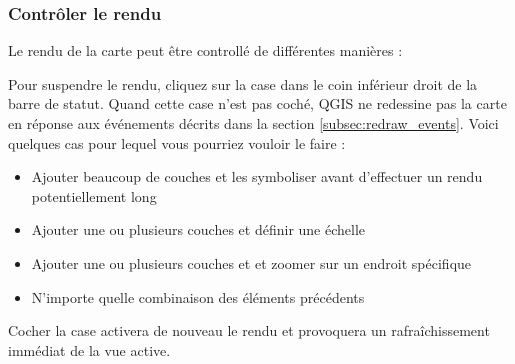 \subsubsection{Contrôler le rendu}\label{label_controlmap}

Le rendu de la carte peut être controllé de différentes manières :

%
%
%

\label{label_suspendrender}

Pour suspendre le rendu, cliquez sur la case dans le coin inférieur droit de la barre de statut. Quand cette case n'est pas coché, QGIS ne redessine pas la carte en réponse aux événements décrits dans la section \ref{subsec:redraw_events}. Voici quelques cas pour lequel vous pourriez vouloir le faire :

\begin{itemize}
\item Ajouter beaucoup de couches et les symboliser avant d'effectuer un rendu potentiellement long
\item Ajouter une ou plusieurs couches et définir une échelle
\item Ajouter une ou plusieurs couches et et zoomer sur un endroit spécifique
\item N'importe quelle combinaison des éléments précédents
\end{itemize}

Cocher la case  activera de nouveau le rendu et provoquera un rafraîchissement immédiat de la vue active.

